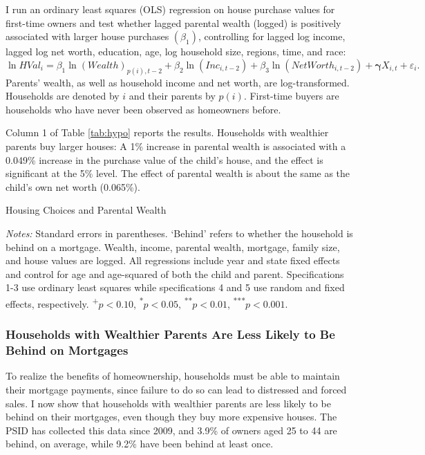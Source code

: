 \documentclass[12pt]{article}
\begin{document}
I run an ordinary least squares (OLS) regression on house purchase values for first-time owners and test whether lagged parental wealth (logged) is positively associated with larger house purchases $(\beta_1)$, controlling for lagged log income, lagged log net worth, education, age, log household size, regions, time, and race:
\begin{equation*}
\ln{HVal_{i}} = \beta_1 \ln(Wealth)_{p(i),t-2} + \beta_2 \ln(Inc_{i,t-2}) + \beta_3 \ln(NetWorth_{i,t-2}) + \mathbf{\gamma}{X_{i,t}} + \varepsilon_{i}.
\end{equation*}
Parents' wealth, as well as household income and net worth, are log-transformed. Households are denoted by $i$ and their parents by $p(i)$. First-time buyers are households who have never been observed as homeowners before.

Column 1 of Table \ref{tab:hypo} reports the results. Households with wealthier parents buy larger houses: A 1\% increase in parental wealth is associated with a 0.049\% increase in the purchase value of the child's house, and the effect is significant at the 5\% level. The effect of parental wealth is about the same as the child's own net worth (0.065\%).


\begin{table}
	\center
	\begin{threeparttable}
		\caption{Housing Choices and Parental Wealth}
		\label{tab:hypo}
		\small 
				

		{\begin{footnotesize}\begin{flushleft}
		\textit{Notes:} Standard errors in parentheses. `Behind' refers to whether the household is behind on a mortgage. Wealth, income, parental wealth, mortgage, family size, and house values are logged. All regressions include year and state fixed effects and control for age and age-squared of both the child and parent. Specifications 1-3 use ordinary least squares while specifications 4 and 5 use random and fixed effects, respectively. \textsuperscript{+}$p<0.10$, \textsuperscript{*}$p<0.05$, \textsuperscript{**}$p<0.01$, \textsuperscript{***}$p<0.001$.
		\end{flushleft}\end{footnotesize}}		
	\end{threeparttable}
\end{table}

\subsubsection{Households with Wealthier Parents Are Less Likely to Be Behind on Mortgages} 
To realize the benefits of homeownership, households must be able to maintain their mortgage payments, since failure to do so can lead to distressed and forced sales. I now show that households with wealthier parents are less likely to be behind on their mortgages, even though they buy more expensive houses. The PSID has collected this data since 2009, and 3.9\% of owners aged 25 to 44 are behind, on average, while 9.2\% have been behind at least once.
\end{document}
